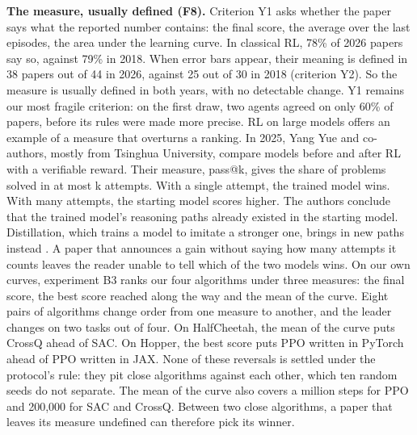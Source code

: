 \documentclass[11pt,a4paper]{article}
\begin{document}
\textbf{The measure, usually defined (F8).} Criterion Y1 asks whether
the paper says what the reported number contains: the final score, the
average over the last episodes, the area under the learning curve. In
classical RL, 78\% of 2026 papers say so, against 79\% in 2018. When
error bars appear, their meaning is defined in 38 papers out of 44 in
2026, against 25 out of 30 in 2018 (criterion Y2). So the measure is
usually defined in both years, with no detectable change. Y1 remains our
most fragile criterion: on the first draw, two agents agreed on only
60\% of papers, before its rules were made more precise. RL on large
models offers an example of a measure that overturns a ranking. In 2025,
Yang Yue and co-authors, mostly from Tsinghua University, compare models
before and after RL with a verifiable reward. Their measure, pass@k,
gives the share of problems solved in at most k attempts. With a single
attempt, the trained model wins. With many attempts, the starting model
scores higher. The authors conclude that the trained model's reasoning
paths already existed in the starting model. Distillation, which trains
a model to imitate a stronger one, brings in new paths instead
\autocite{yue2025rlvr}. A paper that announces a gain without saying how
many attempts it counts leaves the reader unable to tell which of the
two models wins. On our own curves, experiment B3 ranks our four
algorithms under three measures: the final score, the best score reached
along the way and the mean of the curve. Eight pairs of algorithms
change order from one measure to another, and the leader changes on two
tasks out of four. On HalfCheetah, the mean of the curve puts CrossQ
ahead of SAC. On Hopper, the best score puts PPO written in PyTorch
ahead of PPO written in JAX. None of these reversals is settled under
the protocol's rule: they pit close algorithms against each other, which
ten random seeds do not separate. The mean of the curve also covers a
million steps for PPO and 200,000 for SAC and CrossQ. Between two close
algorithms, a paper that leaves its measure undefined can therefore pick
its winner.
\end{document}
